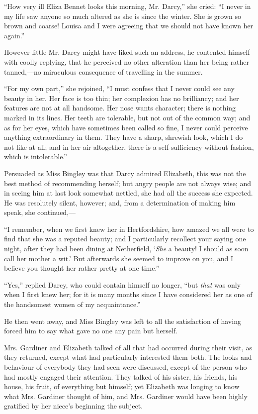 \documentclass[12pt,openright]{book}
\begin{document}
“How very ill Eliza Bennet looks this morning, Mr. Darcy,” she cried: “I never in my life saw anyone so much altered as she is since the winter. She is grown so brown and coarse! Louisa and I were agreeing that we should not have known her again.”

However little Mr. Darcy might have liked such an address, he contented himself with coolly replying, that he perceived no other alteration than her being rather tanned,—no miraculous consequence of travelling in the summer.

“For my own part,” she rejoined, “I must confess that I never could see any beauty in her. Her face is too thin; her complexion has no brilliancy; and her features are not at all handsome. Her nose wants character; there is nothing marked in its lines. Her teeth are tolerable, but not out of the common way; and as for her eyes, which have sometimes been called so fine, I never could perceive anything extraordinary in them. They have a sharp, shrewish look, which I do not like at all; and in her air altogether, there is a self-sufficiency without fashion, which is intolerable.”

Persuaded as Miss Bingley was that Darcy admired Elizabeth, this was not the best method of recommending herself; but angry people are not always wise; and in seeing him at last look somewhat nettled, she had all the success she expected. He was resolutely silent, however; and, from a determination of making him speak, she continued,—

“I remember, when we first knew her in Hertfordshire, how amazed we all were to find that she was a reputed beauty; and I particularly recollect your saying one night, after they had been dining at Netherfield, ‘\textit{She} a beauty! I should as soon call her mother a wit.’ But afterwards she seemed to improve on you, and I believe you thought her rather pretty at one time.”

“Yes,” replied Darcy, who could contain himself no longer, “but \textit{that} was only when I first knew her; for it is many months since I have considered her as one of the handsomest women of my acquaintance.”

He then went away, and Miss Bingley was left to all the satisfaction of having forced him to say what gave no one any pain but herself.

Mrs. Gardiner and Elizabeth talked of all that had occurred during their visit, as they returned, except what had particularly interested them both. The looks and behaviour of everybody they had seen were discussed, except of the person who had mostly engaged their attention. They talked of his sister, his friends, his house, his fruit, of everything but himself; yet Elizabeth was longing to know what Mrs. Gardiner thought of him, and Mrs. Gardiner would have been highly gratified by her niece’s beginning the subject.
\end{document}
